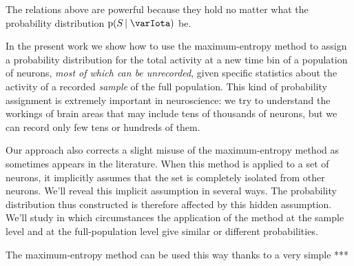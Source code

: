 \documentclass[\ifafour a4paper,12pt,\else a5paper,10pt,\fi%
onecolumn,oneside,article,%
british%
]{memoir}
\theoremstyle{remark}
\theoremstyle{innote}
\newcommand*{\pf}{\mathrm{p}}%
\renewcommand*{\|}{\nonscript\,\vert\nonscript\;\mathopen{}}
\newcommand*{\yH}{\varIota}
\begin{document}
The relations above are powerful because they hold no matter what the
probability distribution $\pf(S\|\yH)$ be.




\bigskip

In the present work we show how to use the maximum-entropy method to assign
a probability distribution for the total activity at a new time bin of a
population of neurons, \emph{most of which can be unrecorded}, given
specific statistics about the activity of a recorded \emph{sample} of the
full population. This kind of probability assignment is extremely important
in neuroscience: we try to understand the workings of brain areas that may
include tens of thousands of neurons, but we can record only few tens or
hundreds of them.

Our approach also corrects a slight misuse of the maximum-entropy method
as sometimes appears in the literature. When this method is applied to a
set of neurons, it implicitly assumes that the set is completely isolated
from other neurons. We'll reveal this implicit assumption in several ways.
The probability distribution thus constructed is therefore affected by this
hidden assumption. We'll study in which circumstances the application of
the method at the sample level and at the full-population level give
similar or different probabilities.

The maximum-entropy method can be used this way thanks to a very simple ***







\clearpage
\end{document}
